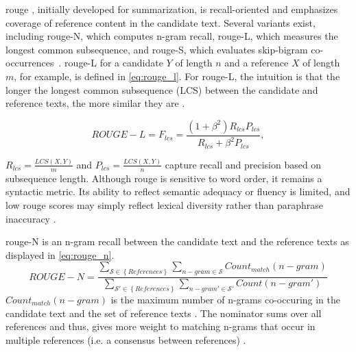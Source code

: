 \ac{rouge} \citep{lin_rouge_2004}, initially developed for summarization, is recall-oriented and emphasizes coverage of reference content in the candidate text. 
Several variants exist, including \ac{rouge}-N, which computes n-gram recall, \ac{rouge}-L, which measures the longest common subsequence, and \ac{rouge}-S, which evaluates skip-bigram co-occurrences~\citep{zhou_paraphrase_2021,palivela_optimization_2021,kurt_pehlivanoglu_comparative_2024}. 
\ac{rouge}-L for a candidate $Y$ of length $n$ and a reference $X$ of length $m$, for example, is defined in \autoref{eq:rouge_l}.
For \ac{rouge}-L, the intuition is that the longer the longest common subsequence (LCS) between the candidate and reference texts, the more similar they are \citep{lin_rouge_2004}.

\begin{equation}
ROUGE-L = F_{lcs} = \frac{(1 + \beta^2)R_{lcs}P_{lcs}}{R_{lcs} + \beta^2 P_{lcs}},
\label{eq:rouge_l}
\end{equation}

$R_{lcs} = \frac{LCS(X,Y)}{m}$ and $P_{lcs} = \frac{LCS(X,Y)}{n}$ capture recall and precision based on subsequence length. 
Although \ac{rouge} is sensitive to word order, it remains a syntactic metric. 
Its ability to reflect semantic adequacy or fluency is limited, and low \ac{rouge} scores may simply reflect lexical diversity rather than paraphrase inaccuracy \citep{kurt_pehlivanoglu_comparative_2024}.

\ac{rouge}-N is an n-gram recall between the candidate text and the reference texts \citep{lin_rouge_2004} as displayed in \autoref{eq:rouge_n}.
\begin{equation}
    ROUGE-N = \frac{\sum_{\mathcal{S} \in \left\{ References \right\}}\sum_{n-gram \in\mathcal{S}}Count_{match}(n-gram)}{\sum_{\mathcal{S'} \in \left\{ References \right\}}\sum_{n-gram' \in\mathcal{S'}}Count(n-gram')}
\label{eq:rouge_n}
\end{equation}
$Count_{match}(n-gram)$ is the maximum number of n-grams co-occuring in the candidate text and the set of reference texts \citep{lin_rouge_2004}.
The nominator sums over all references and thus, gives more weight to matching n-grams that occur in multiple references (i.e. a consensus between references) \citep{lin_rouge_2004}.

